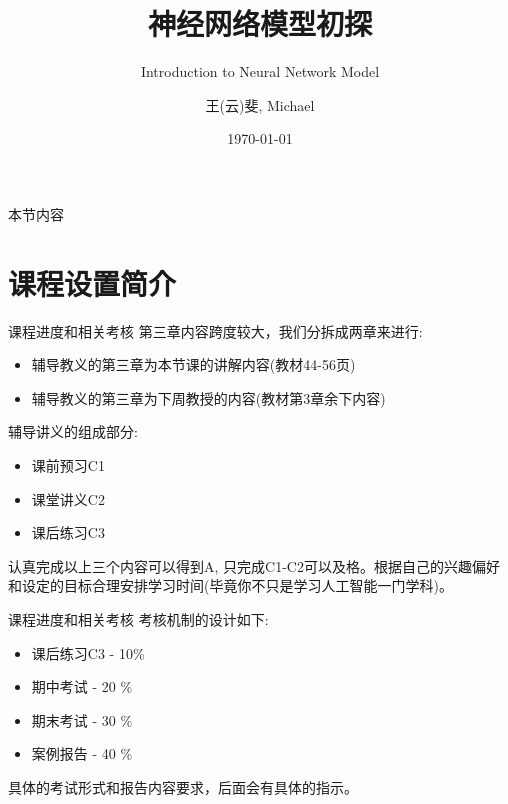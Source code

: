 \documentclass[handout]{beamer}
\title[]{神经网络模型初探}
\subtitle{Introduction to Neural Network Model}
\date{\today}
\author[Michael]{王(云)斐, Michael}
\institute[SenseTime]{\url{https://www.michaelyunfei.com} \and \url{https://github.com/Michael-yunfei/MDLforBeginners}}
\begin{document}



\begin{frame}[noframenumbering]
  \titlepage
\end{frame}



\begin{frame}{本节内容}
	\tableofcontents
\end{frame}

\section{课程设置简介}

\begin{frame}{课程进度和相关考核}
第三章内容跨度较大，我们分拆成两章来进行:
\begin{itemize}
\setlength\itemsep{1em}
	\item 辅导教义的第三章为本节课的讲解内容(教材44-56页)
	\item 辅导教义的第三章为下周教授的内容(教材第3章余下内容)
\end{itemize}

\hfil

辅导讲义的组成部分:
\begin{itemize}
\setlength\itemsep{1em}
	\item 课前预习C1
	\item 课堂讲义C2
	\item 课后练习C3
\end{itemize}

\hfil 

认真完成以上三个内容可以得到A, 只完成C1-C2可以及格。根据自己的兴趣偏好和设定的目标合理安排学习时间(毕竟你不只是学习人工智能一门学科)。
\end{frame}

\begin{frame}{课程进度和相关考核}
	考核机制的设计如下:
	
	\hfil
	
	\begin{itemize}
	\setlength\itemsep{1em}
		\item 课后练习C3 - 10\% 
		\item 期中考试 - 20 \% 
		\item 期末考试 - 30 \%
		\item 案例报告 - 40 \% 
	\end{itemize}
	具体的考试形式和报告内容要求，后面会有具体的指示。
\end{frame}
\end{document}
